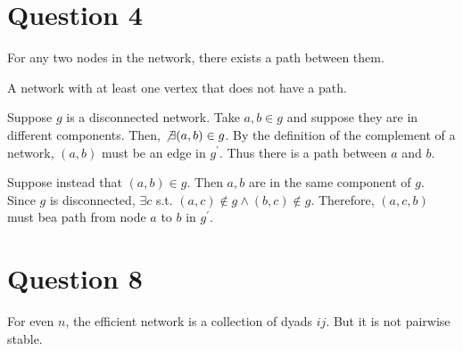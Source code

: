 \section*{Question 4}
\begin{definition}
 For any two nodes in the network, there exists a path between them. 
\end{definition}
\begin{definition}
A network with at least one vertex that does not have a path.
\end{definition}
Suppose $g$ is a disconnected network. Take $a, b \in g$ and suppose they are in different components. Then, $\not \exists (a, b) \in g$. By the definition of the complement of a network, $(a, b)$ must be an edge in $g^\prime$. Thus there is a path between $a$ and $b$. 


Suppose instead that $(a, b) \in g$. Then $a, b$ are in the same component of $g$. Since $g$ is disconnected, $\exists c$ s.t. $(a, c) \not \in g \land (b, c) \not \in g$. Therefore, $(a, c, b)$ must bea  path from node $a$ to $b$ in $g^\prime$. 
\section*{Question 8}
For even $n$, the efficient network is a collection of dyads $ij$. But it is not pairwise stable.



